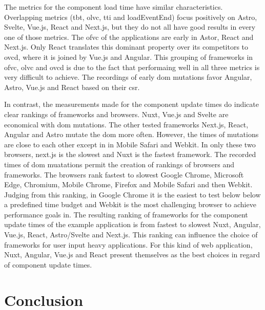 \documentclass[a4paper, 10pt]{article}
\begin{document}
The metrics for the component load time have similar characteristics.
Overlapping metrics (\acrshort{tbt}, \acrshort{olvc}, \acrshort{tti} and loadEventEnd) focus positively on Astro, Svelte, Vue.js, React and Next.js, but they do not all have good results in every one of those metrics.
The \acrshort{ofvc} of the applications are early in Astor, React and Next.js.
Only React translates this dominant property over its competitors to \acrshort{ovcd}, where it is joined by Vue.js and Angular.
This grouping of frameworks in \acrshort{ofvc}, \acrshort{olvc} and \acrshort{ovcd} is due to the fact that performaing well in all three metrics is very difficult to achieve.
The recordings of early \acrshort{dom} mutations favor Angular, Astro, Vue.js and React based on their \acrshort{csr}.

In contrast, the measurements made for the component update times do indicate clear rankings of frameworks and browsers.
Nuxt, Vue.js and Svelte are economical with \acrshort{dom} mutations.
The other tested frameworks Next.js, React, Angular and Astro mutate the \acrshort{dom} more often.
However, the times of mutations are close to each other except in in Mobile Safari and Webkit.
In only these two browsers, next.js is the slowest and Nuxt is the fastest framework.
The recorded times of \acrshort{dom} muatations permit the creation of rankings of browsers and frameworks.
The browsers rank fastest to slowest Google Chrome, Microsoft Edge, Chromium, Mobile Chrome, Firefox and Mobile Safari and then Webkit.
Judging from this ranking, in Google Chrome it is the easiest to test below below a predefined time budget and Webkit is the most challenging browser to achieve performance goals in.
The resulting ranking of frameworks for the component update times of the example application is from fastest to slowest Nuxt, Angular, Vue.js, React, Astro/Svelte and Next.js.
This ranking can influence the choice of frameworks for user input heavy applications.
For this kind of web application, Nuxt, Angular, Vue.js and React present themselves as the best choices in regard of component update times.

\section{Conclusion}\label{sec:conclusion}
\end{document}
